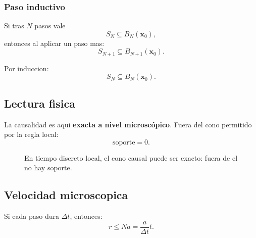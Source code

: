 \subsubsection*{Paso inductivo}
Si tras \(N\) pasos vale
\begin{equation}
S_N \subseteq B_N(\bm{x}_0),
\end{equation}
entonces al aplicar un paso mas:
\begin{equation}
S_{N+1} \subseteq B_{N+1}(\bm{x}_0).
\end{equation}

Por induccion:
\begin{equation}
S_N \subseteq B_N(\bm{x}_0).
\label{c20:eq:exactsupport}
\end{equation}

\subsection{Lectura fisica}
La causalidad es aqui \textbf{exacta a nivel microscópico}. Fuera del cono permitido por la regla local:
\begin{equation}
\text{soporte} = 0.
\end{equation}

\begin{figure}[h!]
\centering
{}
\caption{En tiempo discreto local, el cono causal puede ser exacto: fuera de el no hay soporte.}
\end{figure}

\subsection{Velocidad microscopica}
Si cada paso dura \(\Delta t\), entonces:
\begin{equation}
r \le Na = \frac{a}{\Delta t} t.
\end{equation}

